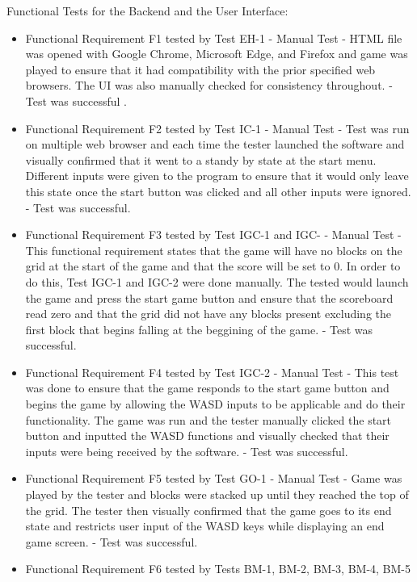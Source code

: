 \documentclass[12pt, titlepage]{article}
\begin{document}
Functional Tests for the Backend and the User Interface:
\begin{itemize}
    \item Functional Requirement F1 tested by Test EH-1
    \subitem - Manual Test
    \subitem - HTML file was opened with Google Chrome, Microsoft Edge, and Firefox and game was played to ensure that it had compatibility with the prior specified web browsers. The UI was also manually checked for consistency throughout.
    \subitem - Test was successful .
    \item Functional Requirement F2 tested by Test IC-1
    \subitem - Manual Test
    \subitem - Test was run on multiple web browser and each time the tester launched the software and visually confirmed that it went to a standy by state at the start menu. Different inputs were given to the program to ensure that it would only leave this state once the start button was clicked and all other inputs were ignored.
    \subitem - Test was successful.
    \item Functional Requirement F3 tested by Test IGC-1 and IGC-
    \subitem - Manual Test
    \subitem - This functional requirement states that the game will have no blocks on the grid at the start of the game and that the score will be set to 0. In order to do this, Test IGC-1 and IGC-2 were done manually. The tested would launch the game and press the start game button and ensure that the scoreboard read zero and that the grid did not have any blocks present excluding the first block that begins falling at the beggining of the game.
    \subitem - Test was successful.
    \item Functional Requirement F4 tested by Test IGC-2
    \subitem - Manual Test
    \subitem - This test was done to ensure that the game responds to the start game button and begins the game by allowing the WASD inputs to be applicable and do their functionality. The game was run and the tester manually clicked the start button and inputted the WASD functions and visually checked that their inputs were being received by the software.
    \subitem - Test was successful.
    \item Functional Requirement F5 tested by Test GO-1
    \subitem - Manual Test
    \subitem - Game was played by the tester and blocks were stacked up until they reached the top of the grid. The tester then visually confirmed that the game goes to its end state and restricts user input of the WASD keys while displaying an end game screen.
    \subitem - Test was successful.
    \item Functional Requirement F6 tested by Tests BM-1, BM-2, BM-3, BM-4, BM-5

\end{itemize}
\end{document}
